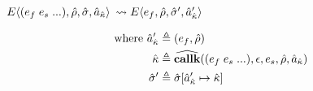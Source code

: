 \documentclass[12pt,draft]{article}
\newcommand{\E}[4]{E\langle #1 , #2 , #3 , #4 \rangle}
\begin{document}
\begin{multicols*}{2}
\begin{align*}
  \end{align*}
  \begin{center}
    $\E{(e_f \; e_s \; ...)}{\aenv}{\astore}{\akaddr}$
    $\leadsto \E{e_f}{\aenv}{\astore'}{\akaddr'}$
  \end{center}
  \vspace{-7mm}
  \begin{align*}
    \text{where }
    \hat{a}_{\hat{\kappa}}' &\triangleq (e_f , \hat{\rho}) \\
    \hat{\kappa}&\triangleq\widehat{\textbf{callk}}((e_f \; e_s \; ...) , \epsilon , e_s , \hat{\rho} , \hat{a}_{\hat{\kappa}}) \\
    \hat{\sigma}' &\triangleq \hat{\sigma} [\hat{a}_{\hat{\kappa}}' \mapsto \hat{\kappa}]
  \end{align*}
\end{multicols*}


\end{document}
